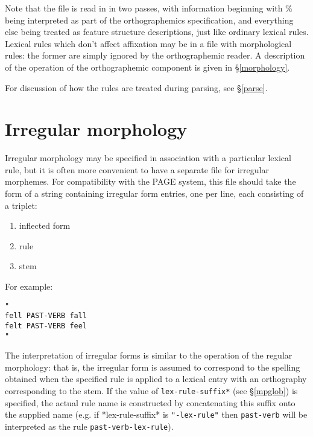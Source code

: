 \documentclass[12pt]{report}
\begin{document}
Note that the file is read in in two passes, with information beginning
with \% being interpreted as part of the orthographemics specification,
and everything else being treated as feature structure descriptions,
just like ordinary lexical rules.
Lexical rules which don't affect affixation may be in a file
with morphological rules: the
former are simply ignored by the orthographemic
reader.
A description of the operation of the orthographemic component is
given in \S\ref{morphology}.

For discussion of how the rules are treated during parsing, see 
\S\ref{parse}.

\section{Irregular morphology}
\label{irregs}

Irregular morphology may be specified in association with a
particular lexical rule, but it is often more convenient
to have a separate file for irregular morphemes.  For compatibility
with the PAGE system, this file should take the form of a string
containing irregular form entries, one per line, each consisting of
a triplet: 
\begin{enumerate}
\item inflected form 
\item rule
\item stem
\end{enumerate}
For example:
\begin{verbatim}
"
fell PAST-VERB fall
felt PAST-VERB feel
"
\end{verbatim}
The interpretation of irregular forms is similar to the operation of the
regular morphology: that is, the irregular form is
assumed to correspond to the spelling obtained when the specified
rule is applied to a lexical entry with an orthography
corresponding to the stem.
If the value of 
{\tt *lex-rule-suffix*} (see \S\ref{mpglob}) is specified,
the actual rule name is constructed by concatenating this suffix
onto the supplied name (e.g. if *lex-rule-suffix* is {\tt "-lex-rule"}
then {\tt past-verb} will be interpreted as 
the rule {\tt past-verb-lex-rule}).
\end{document}
